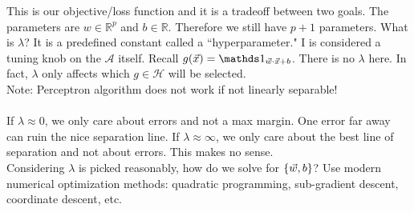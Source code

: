 \documentclass[12pt]{article}
\begin{document}
This is our objective/loss function and it is a tradeoff between two goals. The parameters are $w \in \mathbb{R}^p$ and $b \in \mathbb{R}$. Therefore we still have $p + 1$ parameters. What is $\lambda$? It is a predefined constant called a ``hyperparameter." I is considered a tuning knob on the $\mathcal{A}$ itself. Recall $g(\vec{x}) = \indicator{\vec{w} \cdot \vec{x} + b}$. There is no $\lambda$ here. In fact, $\lambda$ only affects which $g \in \mathcal{H}$ will be selected. \\
Note: Perceptron algorithm does not work if not linearly separable! \\~\\
If $\lambda \approx 0$, we only care about errors and not a max margin. One error far away can ruin the nice separation line. If $\lambda \approx \infty$, we only care about the best line of separation and not about errors. This makes no sense. \\
Considering $\lambda$ is picked reasonably, how do we solve for $\left\{ \vec{w}, b \right\}$? Use modern numerical optimization methods: quadratic programming, sub-gradient descent, coordinate descent, etc. 
\end{document}
